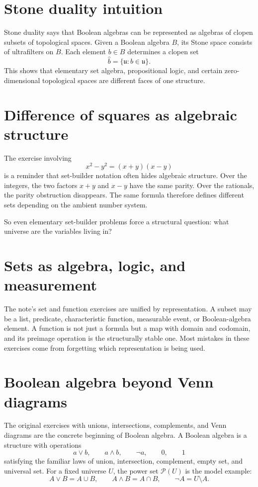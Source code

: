 \section{Stone duality intuition}

Stone duality says that Boolean algebras can be represented as algebras of clopen subsets of topological spaces.  Given a Boolean algebra \(B\), its Stone space consists of ultrafilters on \(B\).  Each element \(b\in B\) determines a clopen set
\[
  \widehat b=\{\mathfrak u: b\in\mathfrak u\}.
\]
This shows that elementary set algebra, propositional logic, and certain zero-dimensional topological spaces are different faces of one structure.

\section{Difference of squares as algebraic structure}

The exercise involving
\[
  x^2-y^2=(x+y)(x-y)
\]
is a reminder that set-builder notation often hides algebraic structure.  Over the integers, the two factors \(x+y\) and \(x-y\) have the same parity.  Over the rationals, the parity obstruction disappears.  The same formula therefore defines different sets depending on the ambient number system.

So even elementary set-builder problems force a structural question: what universe are the variables living in?

\section{Sets as algebra, logic, and measurement}

The note's set and function exercises are unified by representation.  A subset may be a list, predicate, characteristic function, measurable event, or Boolean-algebra element.  A function is not just a formula but a map with domain and codomain, and its preimage operation is the structurally stable one.  Most mistakes in these exercises come from forgetting which representation is being used.

\section{Boolean algebra beyond Venn diagrams}

The original exercises with unions, intersections, complements, and Venn diagrams are the concrete beginning of Boolean algebra.  A Boolean algebra is a structure with operations
\[
  a\vee b,\qquad a\wedge b,\qquad \neg a,\qquad 0,\qquad 1
\]
satisfying the familiar laws of union, intersection, complement, empty set, and universal set.  For a fixed universe $U$, the power set $\mathcal P(U)$ is the model example:
\[
  A\vee B=A\cup B,\qquad A\wedge B=A\cap B,\qquad \neg A=U\setminus A.
\]

